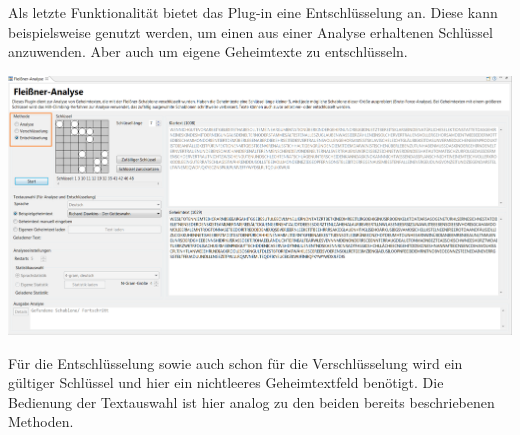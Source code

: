 \documentclass[fontsize=12pt, DIV=15, parskip=half-]{scrartcl}
\theoremstyle{break}
\begin{document}
Als letzte Funktionalität bietet das Plug-in eine Entschlüsselung an. Diese kann beispielsweise genutzt werden, um einen aus einer Analyse erhaltenen Schlüssel anzuwenden. Aber auch um eigene Geheimtexte zu entschlüsseln. 

\includegraphics[scale=0.45]{FleissnerDecrypt.png}

Für die Entschlüsselung sowie auch schon für die Verschlüsselung wird ein gültiger Schlüssel und hier ein nichtleeres Geheimtextfeld benötigt. Die Bedienung der Textauswahl ist hier analog zu den beiden bereits beschriebenen Methoden.
\end{document}
